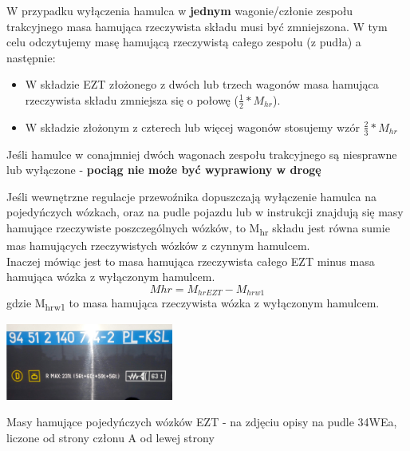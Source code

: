 \begin{tcolorbox}[colback=green!15!white,colframe=green!75!black,title=Zmiana M\textsubscript{hr} po wyłączeniu hamulca zespołu trakcyjnego - wariant 1]
	W przypadku wyłączenia hamulca w \textbf{jednym} wagonie/członie zespołu trakcyjnego masa hamująca rzeczywista składu musi być zmniejszona. W tym celu odczytujemy masę hamującą rzeczywistą całego zespołu (z pudła) a następnie:
	\begin{itemize}
		\item W składzie EZT złożonego z dwóch lub trzech wagonów masa hamująca rzeczywista składu zmniejsza się o połowę ($ \frac{1}{2}*M_{hr} $).
		\item W składzie złożonym z czterech lub więcej wagonów stosujemy wzór $ \frac{2}{3}*M_{hr} $ 
	\end{itemize}
	Jeśli hamulce w conajmniej dwóch wagonach zespołu trakcyjnego są niesprawne lub wyłączone - \textbf{pociąg nie może być wyprawiony w drogę}	
\end{tcolorbox}

\begin{tcolorbox}[colback=yellow!15!white,colframe=green!75!black,title=Zmiana M\textsubscript{hr} po wyłączeniu hamulca zespołu trakcyjnego - wariant 2]
	Jeśli wewnętrzne regulacje przewoźnika dopuszczają wyłączenie hamulca na pojedyńczych wózkach, oraz na pudle pojazdu lub w instrukcji znajdują się masy hamujące rzeczywiste poszczególnych wózków, to M\textsubscript{hr} składu jest równa sumie mas hamujących rzeczywistych wózków z czynnym hamulcem.
	\\ Inaczej mówiąc jest to masa hamująca rzeczywista całego EZT minus masa hamująca wózka z wyłączonym hamulcem.
	\[ M{hr} = M_{hrEZT} - M_{hrw1}  \] gdzie M\textsubscript{hrw1} to masa hamująca rzeczywista wózka z wyłączonym hamulcem.
\end{tcolorbox}
\begin{marginfigure}
	\includegraphics[width=5.5cm]{skryptkierownik-img/mhr-wozki.jpg}
	\caption{Masy hamujące pojedyńczych wózków EZT - na zdjęciu opisy na pudle 34WEa, liczone od strony członu A od lewej strony}
\end{marginfigure}

